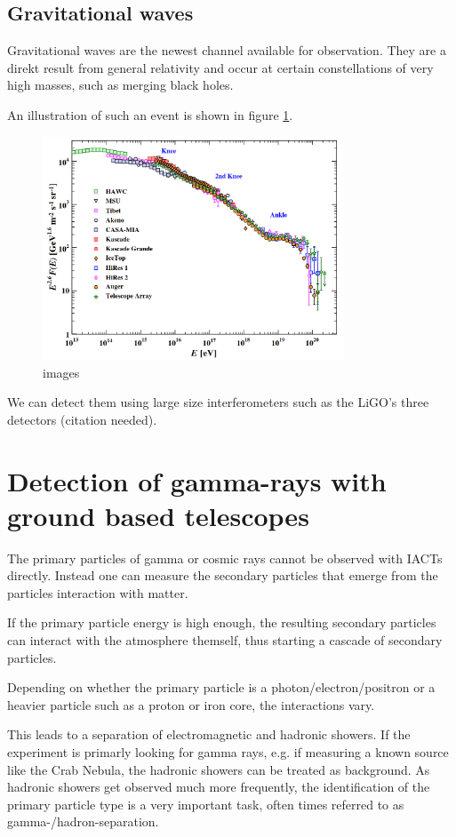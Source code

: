 \subsection{Gravitational waves}
Gravitational waves are the newest channel available for observation.
They are a direkt result from general relativity and occur
at certain constellations of very high masses, such as 
merging black holes.

An illustration of such an event is shown in figure \ref{fig:gravi_waves}. 
\begin{figure}
	\centering
	\includegraphics[width=0.8\textwidth]{images/cr_spectrum.png}
	\caption{images}
	\label{fig:gravi_waves}
\end{figure}


We can detect them using large size interferometers such as
the LiGO's three detectors (citation needed).
\fi

\section{Detection of gamma-rays with ground based telescopes}
The primary particles of gamma or cosmic rays cannot be 
observed with IACTs directly. Instead one can measure the secondary particles
that emerge from the particles interaction with matter.

If the primary particle energy is high enough, the resulting 
secondary
particles can interact with the atmosphere themself, thus starting a 
cascade of secondary particles.

Depending on whether the primary particle is 
a photon/electron/positron or a heavier particle such as a proton 
or iron core, the interactions vary.

This leads to a separation of electromagnetic and hadronic showers.
If the experiment is primarly looking for 
gamma rays, e.g. if measuring a known source like the Crab Nebula, 
the hadronic showers can be treated as background.
As hadronic showers get observed much more frequently, 
the identification of the primary particle type is a very important 
task, often times referred to as gamma-/hadron-separation.

